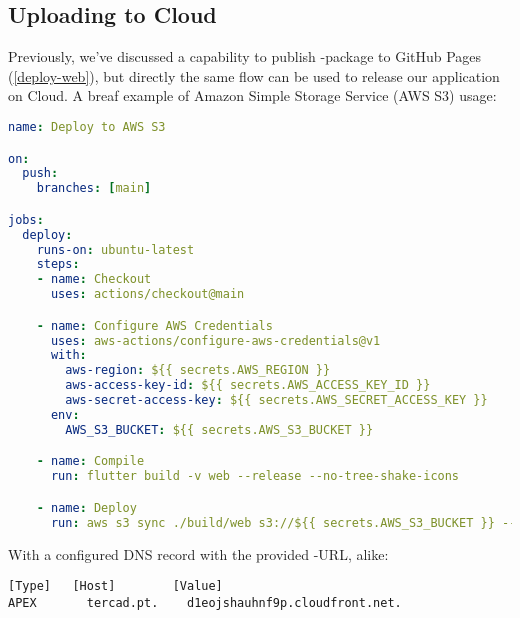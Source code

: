 
\subsection{Uploading to Cloud}

Previously, we've discussed a capability to publish -package to GitHub Pages (\ref{deploy-web}), but 
directly the same flow can be used to release our application on Cloud. A breaf example of Amazon Simple Storage 
Service (AWS S3) usage:

\begin{lstlisting}[language=yaml]
name: Deploy to AWS S3

on: 
  push:
    branches: [main]

jobs:
  deploy:
    runs-on: ubuntu-latest
    steps:
    - name: Checkout
      uses: actions/checkout@main

    - name: Configure AWS Credentials
      uses: aws-actions/configure-aws-credentials@v1
      with:
        aws-region: ${{ secrets.AWS_REGION }}
        aws-access-key-id: ${{ secrets.AWS_ACCESS_KEY_ID }}
        aws-secret-access-key: ${{ secrets.AWS_SECRET_ACCESS_KEY }}
      env:
        AWS_S3_BUCKET: ${{ secrets.AWS_S3_BUCKET }}

    - name: Compile
      run: flutter build -v web --release --no-tree-shake-icons

    - name: Deploy
      run: aws s3 sync ./build/web s3://${{ secrets.AWS_S3_BUCKET }} --delete
\end{lstlisting}

\noindent With a configured DNS record with the provided -URL, alike:

\begin{lstlisting}[language=terminal]
[Type]	 [Host]        [Value]
APEX	   tercad.pt.    d1eojshauhnf9p.cloudfront.net.
\end{lstlisting}
